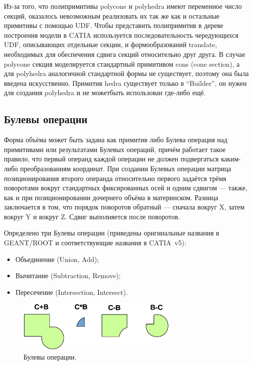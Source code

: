 Из-за того, что полипримитивы polycone и polyhedra имеют переменное число секций, оказалось невозможным реализовать их так же как и остальные примитивы с помощью UDF. Чтобы представить полипримитив в дереве построения модели в CATIA используется последовательность чередующихся UDF, описывающих отдельные секции, и формообразований translate, необходимых для обеспечения сдвига секций относительно друг друга. В случае polycone секция моделируется стандартный примитивом cons (cone section), а для polyhedra аналогичной стандартной формы не существует, поэтому она была введена искусственно. Примитив hedra существует только в ``Builder'', он нужен для создания polyhedra и не можетбыть использован где-либо ещё.

\subsection{Булевы операции}\label{sec:Boolean}

Форма объёма может быть задана как примитив либо Булева операция над примитивами или результатами Булевых операций, причём работает такое правило, что первый операнд каждой операции не должен подвергаться каким-либо преобразованиям координат. При создании Булевых операции матрица позиционирования второго операнда относительно первого задаётся трёмя поворотами вокруг стандартных фиксированных осей и одним сдвигом --- также, как и при позиционировании дочернего объёма в материнском. Разница заключается в том, что порядок поворотов обратный --- сначала вокруг X, затем вокруг Y и вокруг Z. Сдвиг выполняется после поворотов.

Определено три Булевы операции (приведены оригинальные названия в GEANT/ROOT и соответствующие названия в CATIA~v5):

\begin{itemize}
\item{Объединение (Union, Add);}
\item{Вычитание (Subtraction, Remove);}
\item{Пересечение (Intersection, Intersect).}
\end{itemize}

\begin{figure}[H]
\centering
\includegraphics[width=0.7\textwidth]{pictures/Boolean.eps}
\caption{Булевы операции.}
\label{fig:Boolean}
\end{figure}

